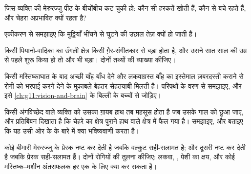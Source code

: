 \begin{exercise}[$\star\star$]\label{exo:g12:brain-and-movement:9}
जिस व्यक्ति की मेरुरज्जु पीठ के बीचोंबीच कट चुकी हो: कौन-सी हरकतें खोती हैं,
कौन-से  बचे रहते हैं, और चेहरा अप्रभावित क्यों रहता है?
\end{exercise}

\begin{exercise}[$\star\star$]\label{exo:g12:brain-and-movement:10}
एकीकरण से समझाइए कि मुट्ठियाँ भींचने से घुटने की उछाल तेज़ क्यों हो जाती है।
\end{exercise}

\begin{exercise}[$\star\star$]\label{exo:g12:brain-and-movement:11}
किसी पियानो-वादिका का उँगली क्षेत्र किसी ग़ैर-संगीतकार से बड़ा होता है, और
उसने सात साल की उम्र से पहले शुरू किया हो तो और भी बड़ा। दोनों तथ्यों की
व्याख्या कीजिए।
\end{exercise}

\begin{exercise}[$\star\star\star$]\label{exo:g12:brain-and-movement:12}
किसी मस्तिष्काघात के बाद अच्छी बाँह बाँध देने और लकवाग्रस्त बाँह का इस्तेमाल
ज़बरदस्ती कराने से रोगी को भरपाई करने देने के मुक़ाबले बेहतर सेहतयाबी मिलती
है। परिपथों के वरण से समझाइए, और इसे \cref{ch:g11:vision-and-brain} के
बिल्ली के बच्चों से जोड़िए।
\end{exercise}

\begin{exercise}[$\star\star\star$]\label{exo:g12:brain-and-movement:13}
किसी अंगविच्छेद वाले व्यक्ति को उसका ग़ायब हाथ तब महसूस होता है जब उसके गाल
को छुआ जाए, और प्रतिबिंबन दिखाता है कि चेहरे का क्षेत्र पुराने हाथ वाले
क्षेत्र में फैल गया है। समझाइए, और बताइए कि यह उसी ओर के  के
बारे में क्या भविष्यवाणी करता है।
\end{exercise}

\begin{exercise}[$\star\star\star$]\label{exo:g12:brain-and-movement:14}
कोई बीमारी मेरुरज्जु के प्रेरक  नष्ट कर देती है जबकि वल्कुट
सही-सलामत है; और दूसरी  नष्ट कर देती है जबकि प्रेरक 
सही-सलामत हैं। दोनों रोगियों की तुलना कीजिए: लकवा, , पेशी का क्षय,
और कोई मस्तिष्क--मशीन अंतराफलक हर एक के लिए क्या कर सकता है।
\end{exercise}

